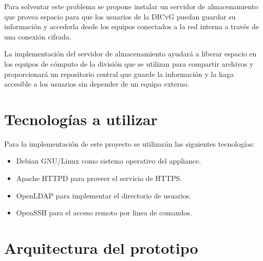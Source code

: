 Para solventar este problema se propone instalar un servidor de almacenamiento que provea espacio para que los usuarios de la \textsc{DICyG} puedan guardar su informaci\'{o}n y accederla desde los equipos conectados a la red interna a trav\'{e}s de una conexi\'{o}n cifrada.

La implementaci\'{o}n del servidor de almacenamiento ayudar\'{a} a liberar espacio en los equipos de c\'{o}mputo de la divisi\'{o}n que se utilizan para compartir archivos y proporcionar\'{a} un repositorio central que guarde la informaci\'{o}n y la haga accesible a los usuarios sin depender de un equipo externo.


    \section {Tecnolog\'{i}as a utilizar}

Para la implementaci\'{o}n de este proyecto se utilizar\'{a}n las siguientes tecnolog\'{i}as:

\begin{itemize}
  \item Debian GNU/Linux como sistema operativo del appliance.
  \item Apache HTTPD para proveer el servicio de HTTPS.
  \item OpenLDAP para implementar el directorio de usuarios.
  \item OpenSSH para el acceso remoto por linea de comandos.
\end{itemize}

    \section {Arquitectura del prototipo}

